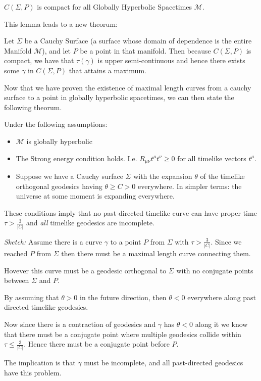 \documentclass[10pt]{article}
\begin{document}
\begin{lemma}
$C(\Sigma,P)$ is compact for all Globally Hyperbolic Spacetimes $\mathcal{M}$.
\end{lemma}

This lemma leads to a new theorum:

\begin{theorem}
Let $\Sigma$ be a Cauchy Surface (a surface whose domain of dependence is the entire Manifold $\mathcal{M}$), and let $P$ be a point in that manifold. Then because $C(\Sigma,P)$ is compact, we have that $\tau(\gamma)$ is upper semi-continuous and hence there exists some $\gamma$ in $C(\Sigma,P)$ that attains a maximum.
\end{theorem}

Now that we have proven the existence of maximal length curves from a cauchy surface to a point in globally hyperbolic spacetimes, we can then state the following theorum.

\begin{theorem}
Under the following assumptions:

\begin{itemize}
\item $\mathcal{M}$ is globally hyperbolic
\item The Strong energy condition holds. I.e. $R_{\mu\nu}t^{\mu}t^{\nu} \geq 0$ for all timelike vectors $t^{\mu}$.
\item Suppose we have a Cauchy surface $\Sigma$ with the expansion $\theta$ of the timelike orthogonal geodesics having $\theta \geq C > 0$ everywhere. In simpler terms: the universe at some moment is expanding everywhere. 
\end{itemize}

These conditions imply that no past-directed timelike curve can have proper time $\tau > \frac{3}{|C|}$ and \textit{all} timelike geodesics are incomplete. 

\textit{Sketch: } Assume there is a curve $\gamma$ to a point $P$ from $\Sigma$ with $\tau > \frac{3}{|C|}$. Since we reached $P$ from $\Sigma$ then there must be a maximal length curve connecting them.

Hovever this curve must be a geodesic orthogonal to $\Sigma$ with no conjugate points between $\Sigma$ and $P$. 


By assuming that $\theta > 0$ in the future direction, then $\theta < 0$ everywhere along past directed timelike geodesics. 

Now since there is a contraction of geodesics and $\gamma$ has $\theta < 0$ along it we know that there must be a conjugate point where multiple geodesics collide within $\tau \leq \frac{3}{|C|}$. Hence there must be a conjugate point before $P$. 

The implication is that $\gamma$ must be incomplete, and all past-directed geodesics have this problem. 
\end{theorem}
\end{document}
